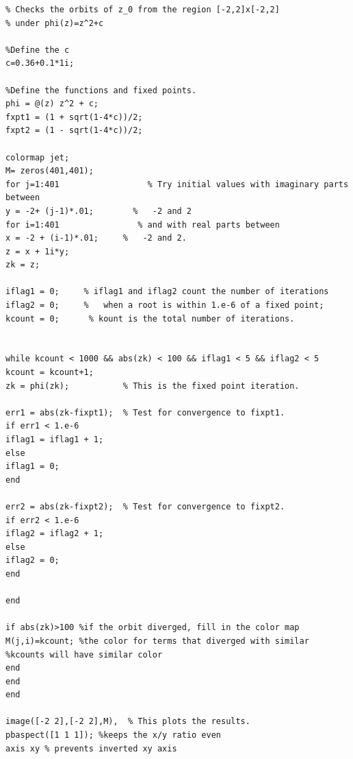 \documentclass[12pt]{article}
\begin{document}
\begin{verbatim}
% Checks the orbits of z_0 from the region [-2,2]x[-2,2]
% under phi(z)=z^2+c

%Define the c
c=0.36+0.1*1i;

%Define the functions and fixed points.
phi = @(z) z^2 + c;
fxpt1 = (1 + sqrt(1-4*c))/2;
fxpt2 = (1 - sqrt(1-4*c))/2;

colormap jet;
M= zeros(401,401);
for j=1:401                  % Try initial values with imaginary parts between
y = -2+ (j-1)*.01;        %   -2 and 2
for i=1:401                % and with real parts between
x = -2 + (i-1)*.01;     %   -2 and 2.
z = x + 1i*y;
zk = z;

iflag1 = 0;     % iflag1 and iflag2 count the number of iterations
iflag2 = 0;     %   when a root is within 1.e-6 of a fixed point;
kcount = 0;      % kount is the total number of iterations.


while kcount < 1000 && abs(zk) < 100 && iflag1 < 5 && iflag2 < 5
kcount = kcount+1;
zk = phi(zk);           % This is the fixed point iteration.

err1 = abs(zk-fixpt1);  % Test for convergence to fixpt1.
if err1 < 1.e-6
iflag1 = iflag1 + 1;
else
iflag1 = 0;
end

err2 = abs(zk-fixpt2);  % Test for convergence to fixpt2.
if err2 < 1.e-6
iflag2 = iflag2 + 1;
else
iflag2 = 0;
end

end

if abs(zk)>100 %if the orbit diverged, fill in the color map
M(j,i)=kcount; %the color for terms that diverged with similar
%kcounts will have similar color
end
end
end

image([-2 2],[-2 2],M),  % This plots the results.
pbaspect([1 1 1]); %keeps the x/y ratio even
axis xy % prevents inverted xy axis
\end{verbatim}
	\begin{verbatim}
		
	\end{verbatim}
	
\end{document}
